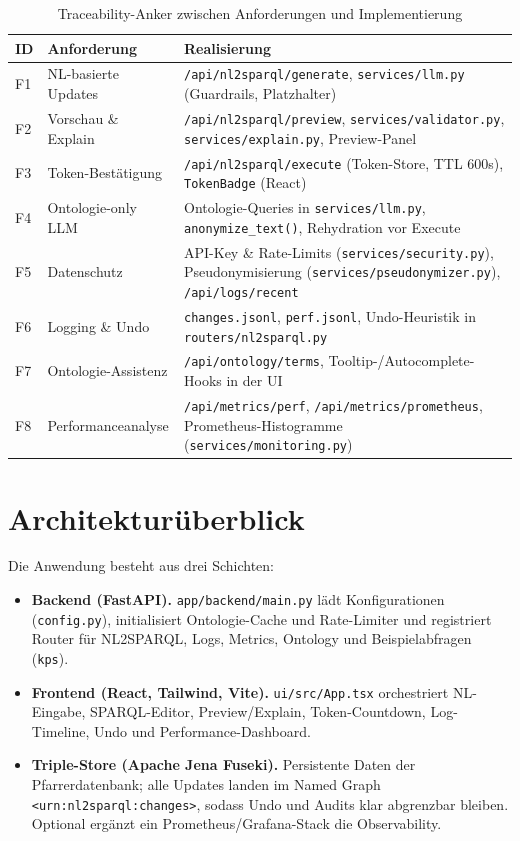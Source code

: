\begin{table}[ht]
  \centering
  \caption{Traceability-Anker zwischen Anforderungen und Implementierung}
  \label{tab:traceability-anforderungen}
  \begin{tabular}{p{}p{}p{}}
    \toprule
    \textbf{ID} & \textbf{Anforderung} & \textbf{Realisierung} \\
    \midrule
    F1 & NL-basierte Updates & \texttt{/api/nl2sparql/generate}, \texttt{services/llm.py} (Guardrails, Platzhalter) \\
    F2 & Vorschau \& Explain & \texttt{/api/nl2sparql/preview}, \texttt{services/validator.py}, \texttt{services/explain.py}, Preview-Panel \\
    F3 & Token-Bestätigung & \texttt{/api/nl2sparql/execute} (Token-Store, TTL 600s), \texttt{TokenBadge} (React) \\
    F4 & Ontologie-only LLM & Ontologie-Queries in \texttt{services/llm.py}, \texttt{anonymize\_text()}, Rehydration vor Execute \\
    F5 & Datenschutz & API-Key \& Rate-Limits (\texttt{services/security.py}), Pseudonymisierung (\texttt{services/pseudonymizer.py}), \texttt{/api/logs/recent} \\
    F6 & Logging \& Undo & \texttt{changes.jsonl}, \texttt{perf.jsonl}, Undo-Heuristik in \texttt{routers/nl2sparql.py} \\
    F7 & Ontologie-Assistenz & \texttt{/api/ontology/terms}, Tooltip-/Autocomplete-Hooks in der UI \\
    F8 & Performanceanalyse & \texttt{/api/metrics/perf}, \texttt{/api/metrics/prometheus}, Prometheus-Histogramme (\texttt{services/monitoring.py}) \\
    \bottomrule
  \end{tabular}
\end{table}

\section{Architekturüberblick}
Die Anwendung besteht aus drei Schichten:
\begin{itemize}
  \item \textbf{Backend (FastAPI).} \texttt{app/backend/main.py} lädt Konfigurationen (\texttt{config.py}), initialisiert Ontologie-Cache und Rate-Limiter und registriert Router für NL2SPARQL, Logs, Metrics, Ontology und Beispielabfragen (\texttt{kps}).
  \item \textbf{Frontend (React, Tailwind, Vite).} \texttt{ui/src/App.tsx} orchestriert NL-Eingabe, SPARQL-Editor, Preview/Explain, Token-Countdown, Log-Timeline, Undo und Performance-Dashboard.
  \item \textbf{Triple-Store (Apache Jena Fuseki).} Persistente Daten der Pfarrerdatenbank; alle Updates landen im Named Graph \texttt{<urn:nl2sparql:changes>}, sodass Undo und Audits klar abgrenzbar bleiben. Optional ergänzt ein Prometheus/Grafana-Stack die Observability.
\end{itemize}

